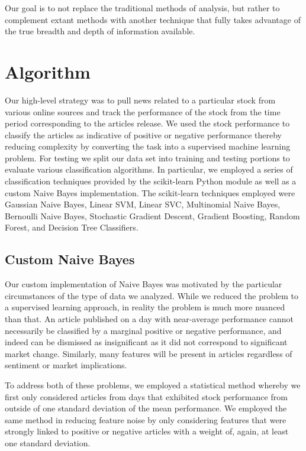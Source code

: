 \documentclass[letterpaper]{article}
\begin{document}
Our goal is to not replace the traditional methods of analysis, but rather to complement extant methods with another technique that fully takes advantage of the true breadth and depth of information available.

\section{Algorithm}
\noindent Our high-level strategy was to pull news related to a particular stock from various online sources and track the performance of the stock from the time period corresponding to the articles release.  We used the stock performance to classify the articles as indicative of positive or negative performance thereby reducing complexity by converting the task into a supervised machine learning problem. For testing we split our data set into training and testing portions to evaluate various classification algorithms. In particular, we employed a series of classification techniques provided by the scikit-learn Python module as well as a custom Naive Bayes implementation.  The scikit-learn techniques employed were Gaussian Naive Bayes, Linear SVM, Linear SVC, Multinomial Naive Bayes, Bernoulli Naive Bayes, Stochastic Gradient Descent, Gradient Boosting, Random Forest, and Decision Tree Classifiers.

\subsection{Custom Naive Bayes}
\noindent Our custom implementation of Naive Bayes was motivated by the particular circumstances of the type of data we analyzed.  While we reduced the problem to a supervised learning approach, in reality the problem is much more nuanced than that. An article published on a day with near-average performance cannot necessarily be classified by a marginal positive or negative performance, and indeed can be dismissed as insignificant as it did not correspond to significant market change. Similarly, many features will be present in articles regardless of sentiment or market implications.

To address both of these problems, we employed a statistical method whereby we first only considered articles from days that exhibited stock performance from outside of one standard deviation of the mean performance. We employed the same method in reducing feature noise by only considering features that were strongly linked to positive or negative articles with a weight of, again, at least one standard deviation.
\end{document}
